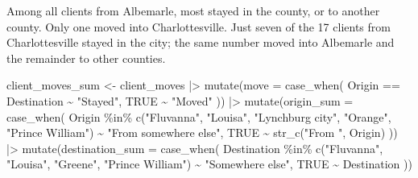 \documentclass[
  letterpaper,
  DIV=11,
  numbers=noendperiod]{scrartcl}
\newenvironment{Shaded}{\begin{snugshade}}{\end{snugshade}}
\newcommand{\AttributeTok}[1]{\textcolor[rgb]{0.40,0.45,0.13}{#1}}
\newcommand{\ConstantTok}[1]{\textcolor[rgb]{0.56,0.35,0.01}{#1}}
\newcommand{\FunctionTok}[1]{\textcolor[rgb]{0.28,0.35,0.67}{#1}}
\newcommand{\NormalTok}[1]{\textcolor[rgb]{0.00,0.23,0.31}{#1}}
\newcommand{\OtherTok}[1]{\textcolor[rgb]{0.00,0.23,0.31}{#1}}
\newcommand{\SpecialCharTok}[1]{\textcolor[rgb]{0.37,0.37,0.37}{#1}}
\newcommand{\StringTok}[1]{\textcolor[rgb]{0.13,0.47,0.30}{#1}}
\begin{document}
Among all clients from Albemarle, most stayed in the county, or to
another county. Only one moved into Charlottesville. Just seven of the
17 clients from Charlottesville stayed in the city; the same number
moved into Albemarle and the remainder to other counties.

\begin{Shaded}
\begin{Highlighting}[]
\NormalTok{client\_moves\_sum }\OtherTok{\textless{}{-}}\NormalTok{ client\_moves }\SpecialCharTok{|\textgreater{}} 
  \FunctionTok{mutate}\NormalTok{(}\AttributeTok{move =} \FunctionTok{case\_when}\NormalTok{(}
\NormalTok{    Origin }\SpecialCharTok{==}\NormalTok{ Destination }\SpecialCharTok{\textasciitilde{}} \StringTok{"Stayed"}\NormalTok{,}
    \ConstantTok{TRUE} \SpecialCharTok{\textasciitilde{}} \StringTok{"Moved"}
\NormalTok{  )) }\SpecialCharTok{|\textgreater{}} 
  \FunctionTok{mutate}\NormalTok{(}\AttributeTok{origin\_sum =} \FunctionTok{case\_when}\NormalTok{(}
\NormalTok{    Origin }\SpecialCharTok{\%in\%} \FunctionTok{c}\NormalTok{(}\StringTok{"Fluvanna"}\NormalTok{, }\StringTok{"Louisa"}\NormalTok{, }\StringTok{"Lynchburg city"}\NormalTok{, }\StringTok{"Orange"}\NormalTok{, }\StringTok{"Prince William"}\NormalTok{) }\SpecialCharTok{\textasciitilde{}} \StringTok{"From somewhere else"}\NormalTok{,}
    \ConstantTok{TRUE} \SpecialCharTok{\textasciitilde{}} \FunctionTok{str\_c}\NormalTok{(}\StringTok{"From "}\NormalTok{, Origin)}
\NormalTok{  )) }\SpecialCharTok{|\textgreater{}} 
  \FunctionTok{mutate}\NormalTok{(}\AttributeTok{destination\_sum =} \FunctionTok{case\_when}\NormalTok{(}
\NormalTok{    Destination }\SpecialCharTok{\%in\%} \FunctionTok{c}\NormalTok{(}\StringTok{"Fluvanna"}\NormalTok{, }\StringTok{"Louisa"}\NormalTok{, }\StringTok{"Greene"}\NormalTok{, }\StringTok{"Prince William"}\NormalTok{) }\SpecialCharTok{\textasciitilde{}} \StringTok{"Somewhere else"}\NormalTok{,}
    \ConstantTok{TRUE} \SpecialCharTok{\textasciitilde{}}\NormalTok{ Destination}
\NormalTok{  ))}


\end{Highlighting}
\end{Shaded}
\end{document}
